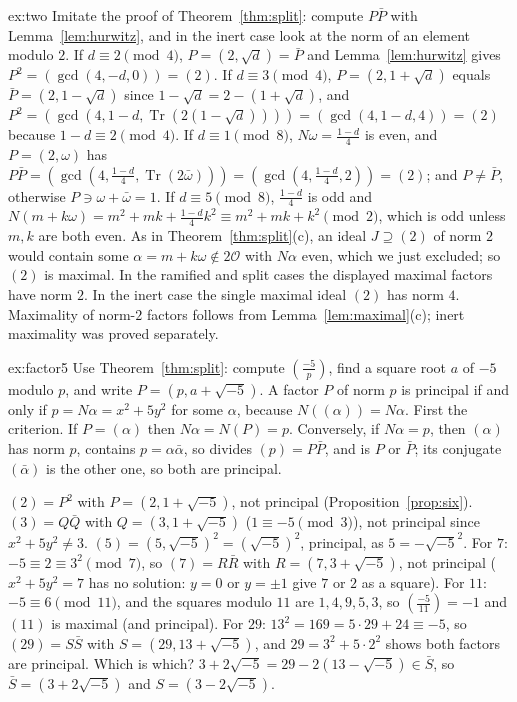 \begin{solution}{ex:two}
\idea Imitate the proof of Theorem~\ref{thm:split}: compute $P\bar P$ with Lemma~\ref{lem:hurwitz}, and in the inert case look at the norm of an element modulo $2$.
\writeup If $d\equiv2\pmod4$, $P=(2,\sqrt d)=\bar P$ and Lemma~\ref{lem:hurwitz} gives $P^2=(\gcd(4,-d,0))=(2)$. If $d\equiv3\pmod4$, $P=(2,1+\sqrt d)$ equals $\bar P=(2,1-\sqrt d)$ since $1-\sqrt d=2-(1+\sqrt d)$, and $P^2=(\gcd(4,1-d,\operatorname{Tr}(2(1-\sqrt d))))=(\gcd(4,1-d,4))=(2)$ because $1-d\equiv2\pmod4$. If $d\equiv1\pmod8$, $N\omega=\frac{1-d}4$ is even, and $P=(2,\omega)$ has $P\bar P=(\gcd(4,\frac{1-d}4,\operatorname{Tr}(2\bar\omega)))=(\gcd(4,\tfrac{1-d}4,2))=(2)$; and $P\ne\bar P$, otherwise $P\ni\omega+\bar\omega=1$. If $d\equiv5\pmod8$, $\frac{1-d}4$ is odd and $N(m+k\omega)=m^2+mk+\frac{1-d}4k^2\equiv m^2+mk+k^2\pmod2$, which is odd unless $m,k$ are both even. As in Theorem~\ref{thm:split}(c), an ideal $J\supseteq(2)$ of norm $2$ would contain some $\alpha=m+k\omega\notin2\mathcal O$ with $N\alpha$ even, which we just excluded; so $(2)$ is maximal. In the ramified and split cases the displayed maximal factors have norm $2$. In the inert case the single maximal ideal $(2)$ has norm $4$. Maximality of norm-$2$ factors follows from Lemma~\ref{lem:maximal}(c); inert maximality was proved separately.
\end{solution}

\begin{solution}{ex:factor5}
\idea Use Theorem~\ref{thm:split}: compute $\left(\frac{-5}p\right)$, find a square root $a$ of $-5$ modulo $p$, and write $P=(p,a+\sqrt{-5})$. A factor $P$ of norm $p$ is principal if and only if $p=N\alpha=x^2+5y^2$ for some $\alpha$, because $N((\alpha))=N\alpha$.
\writeup First the criterion. If $P=(\alpha)$ then $N\alpha=N(P)=p$. Conversely, if $N\alpha=p$, then $(\alpha)$ has norm $p$, contains $p=\alpha\bar\alpha$, so divides $(p)=P\bar P$, and is $P$ or $\bar P$; its conjugate $(\bar\alpha)$ is the other one, so both are principal.

$(2)=P^2$ with $P=(2,1+\sqrt{-5})$, not principal (Proposition~\ref{prop:six}). $(3)=Q\bar Q$ with $Q=(3,1+\sqrt{-5})$ ($1\equiv-5\pmod3$), not principal since $x^2+5y^2\ne3$. $(5)=(5,\sqrt{-5})^2=(\sqrt{-5})^2$, principal, as $5=-\sqrt{-5}^2$. For $7$: $-5\equiv2\equiv3^2\pmod7$, so $(7)=R\bar R$ with $R=(7,3+\sqrt{-5})$, not principal ($x^2+5y^2=7$ has no solution: $y=0$ or $y=\pm1$ give $7$ or $2$ as a square). For $11$: $-5\equiv6\pmod{11}$, and the squares modulo $11$ are $1,4,9,5,3$, so $\left(\frac{-5}{11}\right)=-1$ and $(11)$ is maximal (and principal). For $29$: $13^2=169=5\cdot29+24\equiv-5$, so $(29)=S\bar S$ with $S=(29,13+\sqrt{-5})$, and $29=3^2+5\cdot2^2$ shows both factors are principal. Which is which? $3+2\sqrt{-5}=29-2(13-\sqrt{-5})\in\bar S$, so $\bar S=(3+2\sqrt{-5})$ and $S=(3-2\sqrt{-5})$.
\end{solution}

